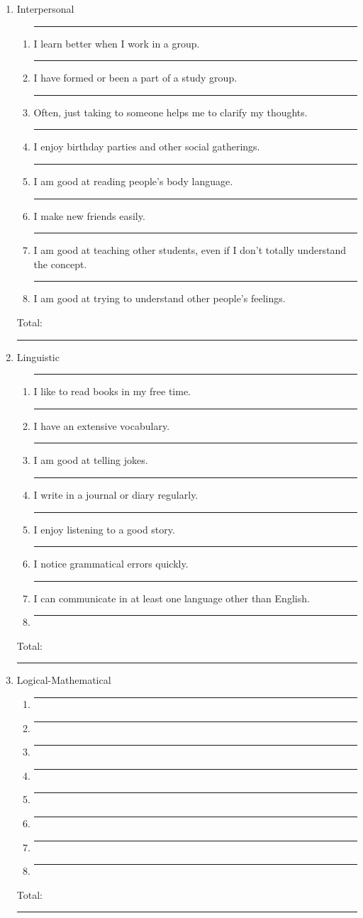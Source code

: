 \documentclass[letterpaper, 11pt]{article}
\begin{document}
\begin{enumerate}
\item Interpersonal
	\begin{enumerate}
	\item \rule{.5in}{.01in} I learn better when I work in a group.
	\item \rule{.5in}{.01in} I have formed or been a part of a study group.
	\item \rule{.5in}{.01in} Often, just taking to someone helps me to clarify my thoughts.
	\item \rule{.5in}{.01in} I enjoy birthday parties and other social gatherings.
	\item \rule{.5in}{.01in} I am good at reading people's body language.
	\item \rule{.5in}{.01in} I make new friends easily.
	\item \rule{.5in}{.01in} I am good at teaching other students, even if I don't totally understand the concept.
	\item \rule{.5in}{.01in} I am good at trying to understand other people's feelings.
\end{enumerate}
Total:  \rule{.5in}{.01in}


\item Linguistic
	\begin{enumerate}
	\item \rule{.5in}{.01in} I like to read books in my free time.
	\item \rule{.5in}{.01in} I have an extensive vocabulary.
	\item \rule{.5in}{.01in} I am good at telling jokes.
	\item \rule{.5in}{.01in} I write in a journal or diary regularly. 
	\item \rule{.5in}{.01in} I enjoy listening to a good story.
	\item \rule{.5in}{.01in} I notice grammatical errors quickly.  
	\item \rule{.5in}{.01in} I can communicate in at least one language other than English.
	\item \rule{.5in}{.01in} 
\end{enumerate}
Total:  \rule{.5in}{.01in}

\item Logical-Mathematical
	\begin{enumerate}
	\item \rule{.5in}{.01in} 
	\item \rule{.5in}{.01in} 
	\item \rule{.5in}{.01in} 
	\item \rule{.5in}{.01in} 
	\item \rule{.5in}{.01in} 
	\item \rule{.5in}{.01in} 
	\item \rule{.5in}{.01in} 
	\item \rule{.5in}{.01in} 
\end{enumerate}
Total:  \rule{.5in}{.01in}


\end{enumerate}
\end{document}
